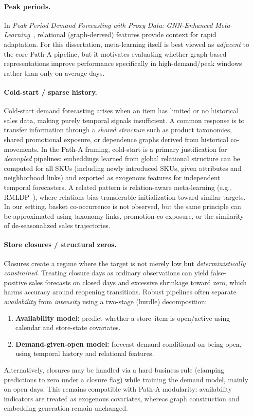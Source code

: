 \paragraph{Peak periods.}
In \emph{Peak Period Demand Forecasting with Proxy Data: GNN-Enhanced Meta-Learning}~\cite{10495591}, relational
(graph-derived) features provide context for rapid adaptation. For this dissertation, meta-learning itself is best viewed as \emph{adjacent} to the core Path-A pipeline, but it motivates evaluating whether graph-based
representations improve performance specifically in high-demand/peak windows rather than only on average days.

\paragraph{Cold-start / sparse history.}
Cold-start demand forecasting arises when an item has limited or no historical sales data, making purely temporal signals insufficient. A common response is to transfer information through a \emph{shared structure} such as product taxonomies, shared promotional exposure, or dependence graphs derived from historical co-movements. In the Path-A
framing, cold-start is a primary justification for \emph{decoupled} pipelines: embeddings learned from global relational structure can be computed for all SKUs (including newly introduced SKUs, given attributes and neighborhood
links) and exported as exogenous features for independent temporal forecasters. A related pattern is relation-aware
meta-learning (e.g., RMLDP~\cite{rmldp}), where relations bias transferable initialization toward similar targets. In our setting, basket co-occurrence is not observed, but the same principle can be approximated using taxonomy links, promotion co-exposure, or the similarity of de-seasonalized sales trajectories.

\paragraph{Store closures / structural zeros.}
Closures create a regime where the target is not merely low but \emph{deterministically constrained}. Treating closure days as ordinary observations can yield false-positive sales forecasts on closed days and excessive shrinkage toward zero, which harms accuracy around reopening transitions. Robust pipelines often separate
\emph{availability} from \emph{intensity} using a two-stage (hurdle) decomposition:
\begin{enumerate}
    \item \textbf{Availability model:} predict whether a store--item is open/active using calendar and store-state covariates.
    \item \textbf{Demand-given-open model:} forecast demand conditional on being open, using temporal history and relational features.
\end{enumerate}
Alternatively, closures may be handled via a hard business rule (clamping predictions to zero under a closure flag) while training the demand model, mainly on open days. This remains compatible with Path-A modularity: availability indicators are treated as exogenous covariates, whereas graph construction and embedding generation remain unchanged.

